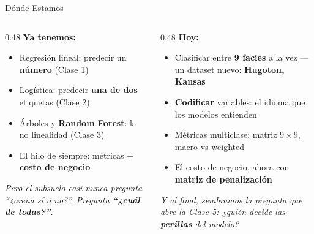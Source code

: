 \documentclass[aspectratio=169, 11pt]{beamer}
\begin{document}
\begin{frame}[shrink=8]{Dónde Estamos}
  \vspace{-4pt}
  \begin{columns}[T]
    \begin{column}{0.48\textwidth}
      {\small\color{arcaDark}\bfseries\faCheckCircle\hspace{5pt}Ya tenemos:}
      \vspace{4pt}
      {\footnotesize\color{textMuted}
      \begin{itemize}\setlength{\itemsep}{3pt}
        \item[{\color{codeGreen}\scriptsize\faCheck}]
          Regresión lineal: predecir un \textbf{número} (Clase 1)
        \item[{\color{codeGreen}\scriptsize\faCheck}]
          Logística: predecir \textbf{una de dos} etiquetas (Clase 2)
        \item[{\color{codeGreen}\scriptsize\faCheck}]
          Árboles y \textbf{Random Forest}: la no linealidad (Clase 3)
        \item[{\color{codeGreen}\scriptsize\faCheck}]
          El hilo de siempre: métricas + \textbf{costo de negocio}
      \end{itemize}
      }
      \vspace{6pt}
      {\scriptsize\color{textMuted}\itshape
        Pero el subsuelo casi nunca pregunta ``¿arena sí o no?''.
        Pregunta \textbf{``¿cuál de todas?''}.}
    \end{column}
    \begin{column}{0.48\textwidth}
      {\small\color{arcaDark}\bfseries\faForward\hspace{5pt}Hoy:}
      \vspace{4pt}
      {\footnotesize\color{textMuted}
      \begin{itemize}\setlength{\itemsep}{3pt}
        \item[{\color{arcaRed}\scriptsize\faArrowRight}]
          Clasificar entre \textbf{9 facies} a la vez --- un dataset nuevo:
          \textbf{Hugoton, Kansas}
        \item[{\color{arcaRed}\scriptsize\faArrowRight}]
          \textbf{Codificar} variables: el idioma que los modelos entienden
        \item[{\color{arcaRed}\scriptsize\faArrowRight}]
          Métricas multiclase: matriz \(9\times9\), macro vs weighted
        \item[{\color{arcaRed}\scriptsize\faStar}]
          El costo de negocio, ahora con \textbf{matriz de penalización}
      \end{itemize}
      }
      \vspace{4pt}
      {\scriptsize\color{arcaDark}\itshape
        Y al final, sembramos la pregunta que abre la Clase 5:
        ¿quién decide las \textbf{perillas} del modelo?}
    \end{column}
  \end{columns}
\end{frame}
\end{document}
